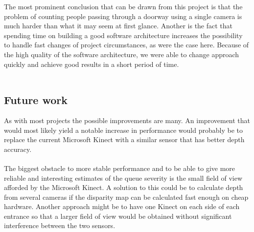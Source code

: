 The most prominent conclusion that can be drawn from this project is that the problem of counting people passing through a doorway using a single camera is much harder than what it may seem at first glance. Another is the fact that spending time on building a good software architecture increases the possibility to handle fast changes of project circumstances, as were the case here. Because of the high quality of the software architecture, we were able to change approach quickly and achieve good results in a short period of time.\\
\\

\subsection{Future work}
As with most projects the possible improvements are many. An improvement that would most likely yield a notable increase in performance would probably be to replace the current Microsoft Kinect with a similar sensor that has better depth accuracy.
\\ \\The biggest obstacle to more stable performance and to be able to give more reliable and interesting estimates of the queue severity is the small field of view afforded by the Microsoft Kinect. A solution to this could be to calculate depth from several cameras if the disparity map can be calculated fast enough on cheap hardware. Another approach might be to have one Kinect on each side of each entrance so that a larger field of view would be obtained without significant interference between the two sensors. \\
\\

















